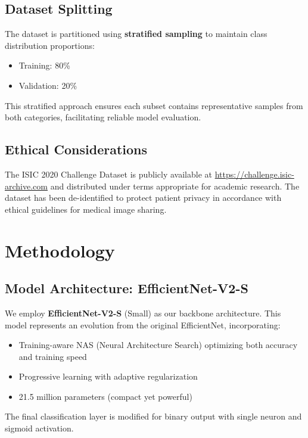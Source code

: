 \documentclass[12pt,a4paper]{article}
\begin{document}
\subsection{Dataset Splitting}

The dataset is partitioned using \textbf{stratified sampling} to maintain class distribution proportions:
\begin{itemize}
    \item Training: 80\%
    \item Validation: 20\%
\end{itemize}

This stratified approach ensures each subset contains representative samples from both categories, facilitating reliable model evaluation.

\subsection{Ethical Considerations}

The ISIC 2020 Challenge Dataset is publicly available at \url{https://challenge.isic-archive.com} and distributed under terms appropriate for academic research. The dataset has been de-identified to protect patient privacy in accordance with ethical guidelines for medical image sharing.

\section{Methodology}
\label{sec:methodology}

\subsection{Model Architecture: EfficientNet-V2-S}

We employ \textbf{EfficientNet-V2-S} (Small) as our backbone architecture. This model represents an evolution from the original EfficientNet, incorporating:
\begin{itemize}
    \item Training-aware NAS (Neural Architecture Search) optimizing both accuracy and training speed
    \item Progressive learning with adaptive regularization
    \item 21.5 million parameters (compact yet powerful)
\end{itemize}

The final classification layer is modified for binary output with single neuron and sigmoid activation.
\end{document}
